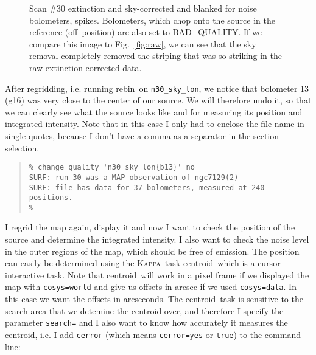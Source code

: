 \documentclass[twoside,11pt]{article}
\newenvironment{myquote}{\begin{quote}\begin{small}}{\end{small}\end{quote}}
\newcommand{\Kappa}{\xref{\textsc{Kappa}}{sun95}{}}
\newcommand{\task}[1]{\textsf{#1}}
\newcommand{\param}[1]{\texttt{#1}}
\newcommand{\rebin}{\xref{\task{rebin}}{sun216}{REBIN}}
\newcommand{\centroid}{\xref{\task{centroid}}{sun95}{CENTROID}}
\newcommand{\xref}[3]{#1}
\begin{document}
\begin{figure}
\begin{center}
\caption{Scan \#30 extinction and sky-corrected and blanked for noise
bolometers, spikes. Bolometers, which chop onto the source in the reference
(off--position) are also set to BAD\_QUALITY. If we compare this image to
Fig.\ \ref{fig:raw}, we can see that the sky removal completely removed the
striping that was so striking in the raw extinction corrected data.}
\label{fig:blanked}
\end{center}

\end{figure}

After regridding, i.e. running \rebin\ on \texttt{n30\_sky\_lon}, we notice
that bolometer 13 (g16) was very close to the center of our source. We
will therefore undo it, so that we can clearly see what the source looks
like and for measuring its position and integrated intensity.  Note that
in this case I only had to enclose the file name in single quotes,
because I don't have a comma as a separator in the section selection.

\begin{myquote} \begin{verbatim}
% change_quality 'n30_sky_lon{b13}' no
SURF: run 30 was a MAP observation of ngc7129(2)
SURF: file has data for 37 bolometers, measured at 240 positions.
% 
\end{verbatim} \end{myquote}

I regrid the map again, display it and now I want to check the position
of the source and determine the integrated intensity. I also want to
check the noise level in the outer regions of the map, which should be
free of emission. The position can easily be determined using the \Kappa\
task \centroid\ which is a cursor interactive task. Note that
\centroid\ will work in a pixel frame if we displayed the map with
\texttt{\param{cosys}=world} and give us offsets in arcsec if we used 
\texttt{\param{cosys}=data}.
In this case we want the offsets in arcseconds. The \centroid\ task
is sensitive to the search area that we detemine the centroid over,
and therefore I specify the parameter \texttt{\param{search}=} and I also want
to know how accurately it measures the centroid, i.e. I add \param{cerror}
(which means \texttt{\param{cerror}=yes} or \texttt{true}) to the command line:
\end{document}
